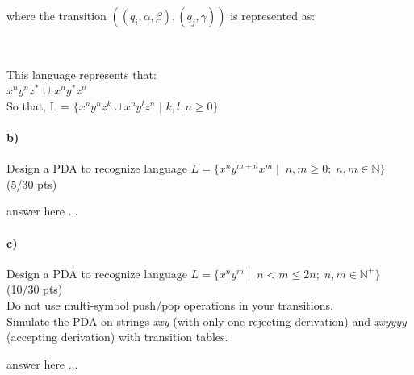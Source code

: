 \documentclass[a4paper,12pt]{article}
\begin{document}
\begin{minipage}{0.60\textwidth}
where the transition $((q_i,\alpha,\beta),(q_j,\gamma)) $ is represented as: 
\end{minipage}
\begin{minipage}{0.30\textwidth}
 \\
\end{minipage}


\begin{tcolorbox}
This language represents that:\\
$x^ny^nz^*$ $\cup$ $x^ny^*z^n$\\
So that, L = $\lbrace x^ny^nz^k \cup x^ny^lz^n$ $|$ $k,l,n \geq 0 \rbrace$\\
\end{tcolorbox}


\paragraph{b)} 
Design a PDA to recognize language $ L=\{x^n y^{m+n} x^m \mid \; n,m \geq 0; \; n,m \in \mathbb{N}  \} $  \hfill \small{(5/30 pts)} \\

\begin{tcolorbox}
answer here ...
\vspace{3cm} %
\end{tcolorbox}

\newpage

\paragraph{c)} 
Design a PDA to recognize language $ L=\{x^n y^m \mid \; n < m \leq 2n; \; n,m \in \mathbb{N^+} \} $  \hfill \small{(10/30 pts)} \\
Do not use multi-symbol push/pop operations in your transitions. \\
Simulate the PDA on strings \textit{xxy} (with only one rejecting derivation) and \textit{xxyyyy} (accepting derivation) with transition tables. \\


\begin{tcolorbox}
answer here ...
\vspace{19cm} %
\end{tcolorbox}
\end{document}

